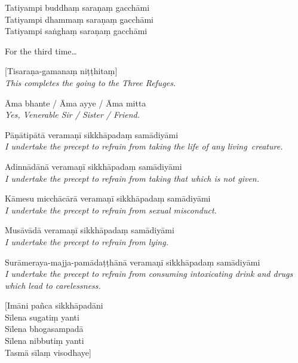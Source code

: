 Tatiyampi buddhaṃ saraṇaṃ gacchāmi\\
Tatiyampi dhammaṃ saraṇaṃ gacchāmi\\
Tatiyampi saṅghaṃ saraṇaṃ gacchāmi

\begin{english}
  For the third time\ldots
\end{english}


[Tisaraṇa-gamanaṃ niṭṭhitaṃ]\\
\emph{This completes the going to the Three Refuges.}


Āma bhante / Āma ayye / Āma mitta\\
\emph{Yes, Venerable Sir / Sister / Friend.}


\enlargethispage{-\baselineskip}

{\raggedright

\begin{packedenumerate}
  \item Pāṇātipātā veramaṇī sikkhāpadaṃ samādiyāmi\\
    \emph{I undertake the precept to refrain from taking the life of any living~creature.}
  \item Adinnādānā veramaṇī sikkhāpadaṃ samādiyāmi\\
    \emph{I undertake the precept to refrain from taking that which is not given.}
  \item Kāmesu micchācārā veramaṇī sikkhāpadaṃ samādiyāmi\\
    \emph{I undertake the precept to refrain from sexual misconduct.}
  \item Musāvādā veramaṇī sikkhāpadaṃ samādiyāmi\\
    \emph{I undertake the precept to refrain from lying.}
  \item Surāmeraya-majja-pamādaṭṭhānā veramaṇī sikkhāpadaṃ samādiyāmi\\
    \emph{I undertake the precept to refrain from consuming intoxicating drink and drugs which lead to carelessness.}
\end{packedenumerate}

}


[Imāni pañca sikkhāpadāni\\
Sīlena sugatiṃ yanti\\
Sīlena bhogasampadā\\
Sīlena nibbutiṃ yanti\\
Tasmā sīlaṃ visodhaye]


